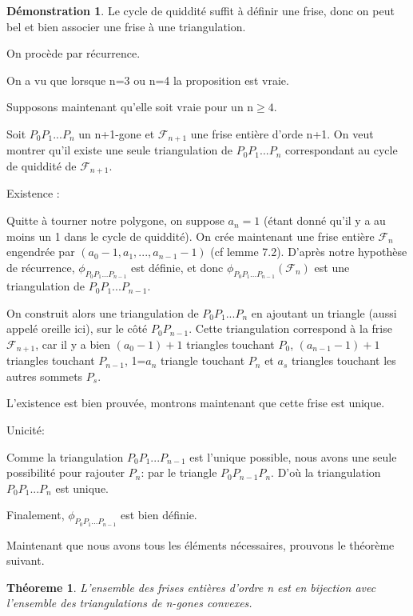 \documentclass[a4paper]{article}
\theoremstyle{plain}
\newtheorem{thm}{Théoreme}[section]
\theoremstyle{definition}
\theoremstyle{proof}
\newtheorem{dem}{Démonstration}
\theoremstyle{remark}
\begin{document}
\begin{dem}
Le cycle de quiddité suffit à définir une frise, donc on peut bel et bien associer une frise à une triangulation.

On procède par récurrence.

On a vu que lorsque n=3 ou n=4 la proposition est vraie.

Supposons maintenant qu'elle soit vraie pour un n$\ge4$.

Soit $P_0P_1...P_{n}$ un n+1-gone et $\mathcal{F}_{n+1}$ une frise entière d'orde n+1.
On veut montrer qu'il existe une seule triangulation de $P_0P_1...P_{n}$ correspondant au cycle de quiddité de $\mathcal{F}_{n+1}$.

Existence :

Quitte à tourner notre polygone, on suppose $a_n=1$ (étant donné qu'il y a au moins un 1 dans le cycle de quiddité). On crée maintenant une frise entière $\mathcal{F}_n$ engendrée par $(a_0-1,a_1,...,a_{n-1}-1)$ (cf lemme 7.2). D'après notre hypothèse de récurrence, $\phi_{P_0P_1...P_{n-1}}$ est définie, et donc $\phi_{P_0P_1...P_{n-1}}(\mathcal{F}_n)$ est une triangulation de $P_0P_1...P_{n-1}$.

On construit alors une triangulation de $P_0P_1...P_{n}$ en ajoutant un triangle (aussi appelé oreille ici), sur le côté $P_0P_{n-1}$. Cette triangulation correspond à la frise $\mathcal{F}_{n+1}$, car il y a bien $(a_0-1)+1$ triangles touchant $P_0$, $(a_{n-1}-1)+1$ triangles touchant $P_{n-1}$, 1=$a_n$ triangle touchant $P_n$ et $a_s$ triangles touchant les autres sommets $P_s$.

L'existence est bien prouvée, montrons maintenant que cette frise est unique.


Unicité:

Comme la triangulation $P_0P_1...P_{n-1}$ est l'unique possible, nous avons une seule possibilité pour rajouter $P_n$: par le triangle $P_0P_{n-1}P_n$. D'où la triangulation $P_0P_1...P_{n}$ est unique.

Finalement, $\phi_{P_0P_1...P_{n-1}}$ est bien définie.
\end{dem}

Maintenant que nous avons tous les éléments nécessaires, prouvons le théorème suivant.

\begin{thm}
L'ensemble des frises entières d'ordre n est en bijection avec l'ensemble des triangulations de n-gones convexes. 
\end{thm}
\end{document}
